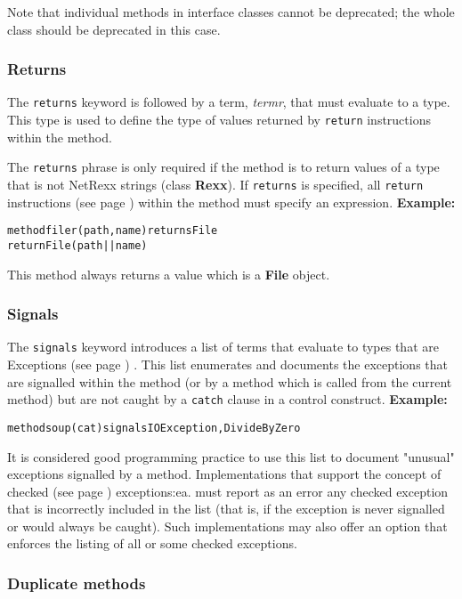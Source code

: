 Note that individual methods in interface classes cannot be
deprecated; the whole class should be deprecated in this case.
\subsubsection{Returns}
 
The \texttt{returns} keyword is followed by a term, \emph{termr},
that must evaluate to a type.
This type is used to define the type of values returned by
\texttt{return} instructions within the method.
 
The \texttt{returns} phrase is only required if the method is to return
values of a type that is not NetRexx strings (class \textbf{Rexx}).
If \texttt{returns} is specified, all
 \texttt{return} instructions (see page \pageref{refreturn})  within the method must
specify an expression.
 \textbf{Example:}
\begin{alltt}
method filer(path, name) returns File
  return File(path||name)
\end{alltt}
This method always returns a value which is a \textbf{File} object.
\subsubsection{Signals}
 
The \texttt{signals} keyword introduces a list of terms that evaluate to
types that are  Exceptions (see page \pageref{refexcep}) .
This list enumerates and documents the exceptions that are signalled
within the method (or by a method which is called from the current
method) but are not caught by a \texttt{catch} clause in a control
construct.
 \textbf{Example:}
\begin{alltt}
method soup(cat) signals IOException, DivideByZero
\end{alltt}
 
It is considered good programming practice to use this list to document
"unusual" exceptions signalled by a method.
Implementations that support the concept of  checked (see page \pageref{refchecked}) 
exceptions:ea. must report as an error any checked exception that is
incorrectly included in the list (that is, if the exception is never
signalled or would always be caught).  Such implementations may also
offer an option that enforces the listing of all or some checked
exceptions.
\subsubsection{Duplicate methods}
 
